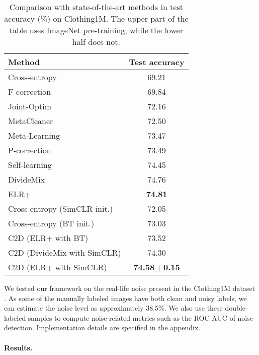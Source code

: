 \documentclass[10pt,twocolumn,letterpaper]{article}
\renewcommand{\cite}[1]{\citep{#1}}
\newcommand{\eb}[1]{{\scriptsize\,$\pm$\,#1}}
\begin{document}
\begin{table}
	\centering
    \setlength\extrarowheight{2pt}
	\begin{tabular}	{l  c }
		\toprule	 	
			\textbf{Method } & \textbf{Test accuracy} \\
			\midrule			
			Cross-entropy & 69.21 \\
			F-correction \cite{patrini2017making}  &69.84\\	
Joint-Optim \cite{tanaka2018joint}  & 72.16\\			
			MetaCleaner \cite{zhang2019metacleaner} & 72.50\\
			Meta-Learning \cite{li2019learning}  & 73.47\\	
			P-correction \cite{yi2019pencil}&73.49\\
			Self-learning \cite{han2019deepself} & 74.45\\
			DivideMix \cite{li2020dividemix}& 74.76\\
			ELR+ \cite{liu2020earlylearning}& \textbf{74.81}\\
			\midrule
			Cross-entropy (SimCLR init.)	 & 72.05\\
			Cross-entropy (BT init.)	 & 73.03\\
			C2D (ELR+ with BT) & 73.52\\
			C2D (DivideMix with SimCLR) & 74.30\\
			C2D (ELR+ with SimCLR) & \textbf{74.58\eb{0.15}}\\
		\bottomrule
	\end{tabular}
\caption
		{
Comparison with state-of-the-art methods in test accuracy (\%) on Clothing1M. The upper part of the table uses ImageNet pre-training, while the lower half does not. }
	\label{tbl:clothing}
\end{table}

We tested our framework on the real-life noise present in the Clothing1M dataset \cite{xiao2015learning}.
As some of the  manually labeled images have both clean and noisy labels, we can estimate the noise level as approximately 38.5\%. We also use these double-labeled samples to compute noise-related metrics such as the ROC AUC of noise detection. 
Implementation details are specified in the appendix. 

\paragraph{Results.} 
\end{document}
